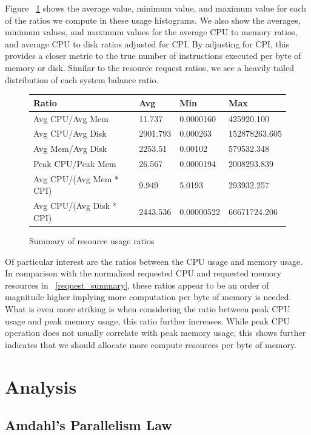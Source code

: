 \documentclass{sig-alternate}
\begin{document}
Figure ~\ref{actual_summary} shows the average value, minimum value, and maximum value for each of the ratios we compute in these usage histograms.
We also show the averages, minimum values, and maximum values for the average CPU to memory ratios, and average CPU to disk ratios adjusted for CPI.
By adjusting for CPI, this provides a closer metric to the true number of instructions executed per byte of memory or disk.
Similar to the resource request ratios, we see a heavily tailed distribution of each system balance ratio.

\begin{figure}[t]
\centering
\begin{tabular}{| p{2.5cm} | p{1.5cm} | p{1.5cm} | p{1.5cm} |} \hline
Ratio & Avg & Min & Max \\ \hline
Avg CPU/Avg Mem & 11.737 & 0.0000160 & 425920.100  \\ \hline
Avg CPU/Avg Disk & 2901.793 & 0.000263 & 152878263.605 \\ \hline
Avg Mem/Avg Disk & 2253.51 & 0.00102 & 579532.348 \\ \hline
Peak CPU/Peak Mem & 26.567 & 0.0000194 & 2008293.839 \\ \hline
Avg CPU/(Avg Mem * CPI) & 9.949 & 5.0193 & 293932.257 \\ \hline
Avg CPU/(Avg Disk * CPI) & 2443.536 & 0.00000522 & 66671724.206 \\ \hline
\end{tabular}
\label{actual_summary}
\caption{Summary of resource usage ratios}
\end{figure}

Of particular interest are the ratios between the CPU usage and memory usage.
In comparison with the normalized requested CPU and requested memory resources in ~\ref{request_summary}, these ratios appear to be an order of magnitude higher implying more computation per byte of memory is needed.
What is even more striking is when considering the ratio between peak CPU usage and peak memory usage, this ratio further increases.
While peak CPU operation does not usually correlate with peak memory usage, this shows further indicates that we should allocate more compute resources per byte of memory.

\section{Analysis}

\subsection{Amdahl's Parallelism Law}
\end{document}
